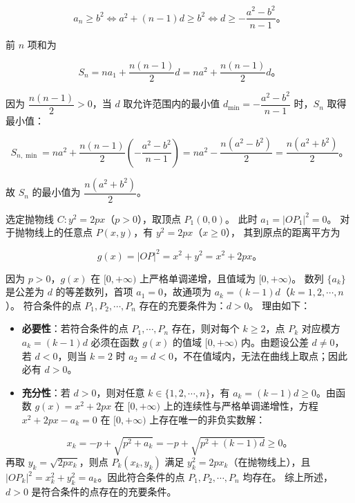 \begin{answer}
\nopagebreak[4]
\[
a_n \geqslant b^2 \iff a^2 + (n - 1)d \geqslant b^2 \iff d \geqslant -\dfrac{a^2 - b^2}{n - 1}\mbox{。}
\]

前 $n$ 项和为

\nopagebreak[4]
\[
S_n = na_1 + \dfrac{n(n - 1)}{2}d = na^2 + \dfrac{n(n - 1)}{2}d\mbox{。}
\]

因为 $\dfrac{n(n - 1)}{2} > 0$，当 $d$ 取允许范围内的最小值 $d_{\min} = -\dfrac{a^2 - b^2}{n - 1}$ 时，$S_n$ 取得最小值：

\nopagebreak[4]
\[
S_{n,\min} = na^2 + \dfrac{n(n - 1)}{2}\left(-\dfrac{a^2 - b^2}{n - 1}\right) = na^2 - \dfrac{n(a^2 - b^2)}{2} = \dfrac{n(a^2 + b^2)}{2}\mbox{。}
\]

故 $S_n$ 的最小值为 $\dfrac{n(a^2 + b^2)}{2}$。


选定抛物线 $C: y^2 = 2px$（$p > 0$），取顶点 $P_1(0, 0)$。
此时 $a_1 = |OP_1|^2 = 0$。
对于抛物线上的任意点 $P(x, y)$，有 $y^2 = 2px$（$x \geqslant 0$），
其到原点的距离平方为

\nopagebreak[4]
\[
g(x) = |OP|^2 = x^2 + y^2 = x^2 + 2px\mbox{。}
\]

因为 $p > 0$，$g(x)$ 在 $[0, +\infty)$ 上严格单调递增，且值域为 $[0, +\infty)$。
数列 $\{a_k\}$ 是公差为 $d$ 的等差数列，首项 $a_1 = 0$，故通项为 $a_k = (k - 1)d$（$k = 1, 2, \cdots, n$）。
符合条件的点 $P_1, P_2, \cdots, P_n$ 存在的充要条件为：$d > 0$。
理由如下：
\begin{itemize}
\item \textbf{必要性}：若符合条件的点 $P_1, \cdots, P_n$ 存在，则对每个 $k \geqslant 2$，点 $P_k$ 对应模方 $a_k = (k - 1)d$ 必须在函数 $g(x)$ 的值域 $[0, +\infty)$ 内。由题设公差 $d \ne 0$，若 $d < 0$，则当 $k = 2$ 时 $a_2 = d < 0$，不在值域内，无法在曲线上取点；因此必有 $d > 0$。
\item \textbf{充分性}：若 $d > 0$，则对任意 $k \in \{1, 2, \cdots, n\}$，有 $a_k = (k - 1)d \geqslant 0$。由函数 $g(x) = x^2 + 2px$ 在 $[0, +\infty)$ 上的连续性与严格单调递增性，方程 $x^2 + 2px - a_k = 0$ 在 $[0, +\infty)$ 上存在唯一的非负实数解：
\end{itemize}
\nopagebreak[4]
\[x_k = -p + \sqrt{p^2 + a_k} = -p + \sqrt{p^2 + (k - 1)d} \geqslant 0\mbox{。}\]
  再取 $y_k = \sqrt{2px_k}$，则点 $P_k(x_k, y_k)$ 满足 $y_k^2 = 2px_k$（在抛物线上），且 $|OP_k|^2 = x_k^2 + y_k^2 = a_k$。因此符合条件的点 $P_1, P_2, \cdots, P_n$ 均存在。
综上所述，$d > 0$ 是符合条件的点存在的充要条件。




\end{answer}